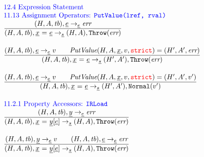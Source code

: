 \documentclass[a4paper, leqno]{amsart}
\newcommand{\rulesep}{\quad\quad}
\newcommand{\stmt}{s}
\newcommand{\expr}{e}
\newcommand{\ir}[1]{\ensuremath{\underline{#1}}}
\newcommand{\irid}{\ir{x}}
\def\inred{\color{red}}
\def\inblue{\color{blue}}
\newcommand{\strict}{{\inred\tt strict}}
\newcommand{\tb}{\emph{tb}}
\newcommand{\err}{\emph{err}}
\newcommand{\hf}[1]{\emph{#1}}
\newcommand{\error}{\ensuremath{{\tt Throw}(\err)}}
\newcommand{\state}{\ensuremath{(H,A,\tb)}}
\newcommand{\res}{\ensuremath{(H,A)}}
\newcommand{\resp}{\ensuremath{(H',A')}}
\newcommand{\evale}{\ensuremath{(H,A,\tb)}}
\def\inred{\color{red}}
\def\inblue{\color{blue}}
\begin{document}
\[
\begin{array}{l@{~~}l@{~~}ll}
\mbox{\inblue 12.4 Expression Statement}\\
\mbox{\inblue 11.13 Assignment Operators: {\tt PutValue(lref, rval)}}\\

\frac{\begin{matrix}
\evale, \ir\expr \rightarrow_{\ir\expr} \err
\end{matrix}}{\begin{matrix}
\state, \irid \ {\tt =} \ \ir\expr \rightarrow_{\ir\stmt}
\res, \error
\end{matrix}}
\\[2em]

\frac{\begin{matrix}
\evale, \ir\expr \rightarrow_{\ir\expr} v
\rulesep
\hf{PutValue}(H,A,\irid,v,\strict) = (H',A',\err)
\end{matrix}}{\begin{matrix}
\state, \irid \ {\tt =} \ \ir\expr \rightarrow_{\ir\stmt}
\resp, \error
\end{matrix}}
\\[2em]

\frac{\begin{matrix}
\evale, \ir\expr \rightarrow_{\ir\expr} v
\rulesep
\hf{PutValue}(H,A,\irid,v,\strict) = (H',A',v')
\end{matrix}}{\begin{matrix}
\state, \irid \ {\tt =} \ \ir\expr \rightarrow_{\ir\stmt}
\resp, {\tt Normal}(v')
\end{matrix}}
\\[2em]

\mbox{\inblue 11.2.1 Property Accessors: {\tt IRLoad}}\\

\frac{\begin{matrix}
\evale, \ir{y} \rightarrow_{\ir\expr} \err
\end{matrix}}{\begin{matrix}
\state, \irid \ {\tt=} \ \ir{y}{\tt[}\ir\expr{\tt]} \rightarrow_{\ir\stmt}
\res, \error
\end{matrix}}
\\[2em]

\frac{\begin{matrix}
\evale, \ir{y} \rightarrow_{\ir\expr} v
\rulesep
\evale, \ir\expr \rightarrow_{\ir\expr} \err
\end{matrix}}{\begin{matrix}
\state, \irid \ {\tt=} \ \ir{y}{\tt[}\ir\expr{\tt]} \rightarrow_{\ir\stmt}
\res, \error
\end{matrix}}
\\[2em]


\end{array}\]
\end{document}
